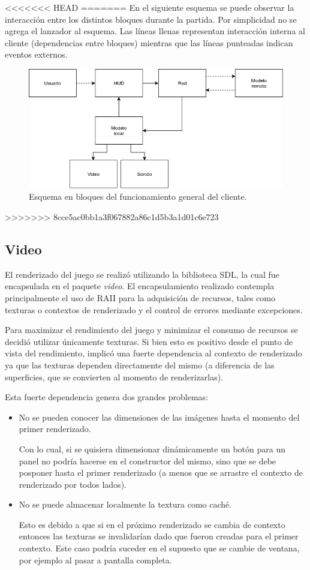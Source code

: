 \documentclass[titlepage,a4paper,12pt]{article}
\begin{document}
<<<<<<< HEAD
=======
En el siguiente esquema se puede observar la interacción entre los distintos bloques durante la partida. Por simplicidad no se agrega el lanzador al esquema. Las líneas llenas representan interacción interna al cliente (dependencias entre bloques) mientras que las líneas punteadas indican eventos externos.
\begin{figure}[H]
	\centering
	\includegraphics[width=16cm]{../imagenes/esquema-bloques-cliente.jpg}
	\caption{\label{fig:esquema-bloques-cliente} Esquema en bloques del funcionamiento general del cliente.}
\end{figure}

>>>>>>> 8cce5ac0bb1a3f067882a86c1d5b3a1d01c6e723
\subsection{Video}
El renderizado del juego se realizó utilizando la biblioteca SDL, la cual fue encapsulada en el paquete \textit{video}. El encapsulamiento realizado contempla principalmente el uso de RAII para la adquisición de recursos, tales como texturas o contextos de renderizado y el control de errores mediante excepciones.

Para maximizar el rendimiento del juego y minimizar el consumo de recursos se decidió utilizar únicamente texturas. Si bien esto es positivo desde el punto de vista del rendimiento, implicó una fuerte dependencia al contexto de renderizado ya que las texturas dependen directamente del mismo (a diferencia de las superficies, que se convierten al momento de renderizarlas).  

Esta fuerte dependencia genera dos grandes problemas:
\begin{itemize}
\item No se pueden conocer las dimensiones de las imágenes hasta el momento del primer renderizado.

Con lo cual, si se quisiera dimensionar dinámicamente un botón para un panel no podría hacerse en el constructor del mismo, sino que se debe posponer hasta el primer renderizado (a menos que se arrastre el contexto de renderizado por todos lados).

\item No se puede almacenar localmente la textura como caché.

Esto es debido a que si en el próximo renderizado se cambia de contexto entonces las texturas se invalidarían dado que fueron creadas para el primer contexto. Este caso podría suceder en el supuesto que se cambie de ventana, por ejemplo al pasar a pantalla completa.
\end{itemize}
\end{document}
